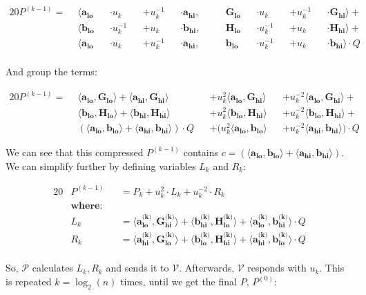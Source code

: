 \documentclass{article}
\newcommand{\eq}[1]{\begin{alignat*}{20}#1\end{alignat*}}
\renewcommand{\vec}[1]{\boldsymbol{#1}}
\newcommand{\V}{\mathcal{V}}
\renewcommand{\P}{\mathcal{P}}
\newcommand{\dotp}[2]{\langle #1, #2 \rangle}
\newcommand{\opn}[1]{\operatorname{#1}}
\newcommand{\veclo}[1]{\vec{#1_{\opn{lo}}}}
\newcommand{\vechi}[1]{\vec{#1_{\opn{hi}}}}
\begin{document}
\eq{
	P^{(k-1)} = \: \:
	&\dotp
		{        \veclo{a} &&\cdot u_k      &&+ u_k^{-1} &&\cdot \vechi{a}}
		{&&\quad \veclo{G} &&\cdot u_k      &&+ u_k^{-1} &&\cdot \vechi{G}}
	+ \\
	&\dotp
		{        \veclo{b} &&\cdot u_k^{-1} &&+ u_k      &&\cdot \vechi{b}}
		{&&\quad \veclo{H} &&\cdot u_k^{-1} &&+ u_k      &&\cdot \vechi{H}}
	+ \\
	&\dotp
		{        \veclo{a} &&\cdot u_k      &&+ u_k^{-1} &&\cdot \vechi{a}}
		{&&\quad \veclo{b} &&\cdot u_k^{-1} &&+ u_k      &&\cdot \vechi{b}}
	\cdot Q \\
}

And group the terms:

\eq{
	P^{(k-1)} = \: \:
	        &\dotp{\veclo{a}}{\veclo{G}}            +
	         \dotp{\vechi{a}}{\vechi{G}}          &&+
	u^2_k    \dotp{\veclo{a}}{\vechi{G}}          &&+
	u^{-2}_k \dotp{\veclo{a}}{\vechi{G}}            +\\
	        &\dotp{\veclo{b}}{\veclo{H}}            +
	         \dotp{\vechi{b}}{\vechi{H}}          &&+
	u^2_k    \dotp{\veclo{b}}{\vechi{H}}          &&+
	u^{-2}_k \dotp{\veclo{b}}{\vechi{H}}            +\\
	       &(\dotp{\veclo{a}}{\veclo{b}}            +
		       \dotp{\vechi{a}}{\vechi{b}}) \cdot Q &&+
	(u^2_k   \dotp{\veclo{a}}{\veclo{b}}          &&+
	u^{-2}_k \dotp{\vechi{a}}{\vechi{b}}) \cdot Q
}

We can see that this compressed $P^{(k-1)}$ contains $c =
(\dotp{\veclo{a}}{\veclo{b}} + \dotp{\vechi{a}}{\vechi{b}})$. We can
simplify further by defining variables $L_k$ and $R_k$:

\eq{
	&P^{(k-1)} &&= P_k + u^2_k \cdot L_k + u^{-2}_k \cdot R_k \\
	&\textbf{where:} \\
	&L_k     &&= \dotp{\veclo{a^{\text{(k)}}}}{\vechi{G^{\text{(k)}}}} +
	             \dotp{\vechi{b^{\text{(k)}}}}{\veclo{H^{\text{(k)}}}} + 
	             \dotp{\veclo{a^{\text{(k)}}}}{\vechi{b^{\text{(k)}}}} \cdot Q \\
	&R_k     &&= \dotp{\vechi{a^{\text{(k)}}}}{\veclo{G^{\text{(k)}}}} +
	             \dotp{\veclo{b^{\text{(k)}}}}{\vechi{H^{\text{(k)}}}} +
	             \dotp{\vechi{a^{\text{(k)}}}}{\veclo{b^{\text{(k)}}}} \cdot Q \\
}

So, $\P$ calculates $L_k, R_k$ and sends it to $\V$. Afterwards,
$\V$ responds with $u_k$. This is repeated $k = \log_2(n)$ times,
until we get the final $P$, $P^{(0)}$:
\end{document}

